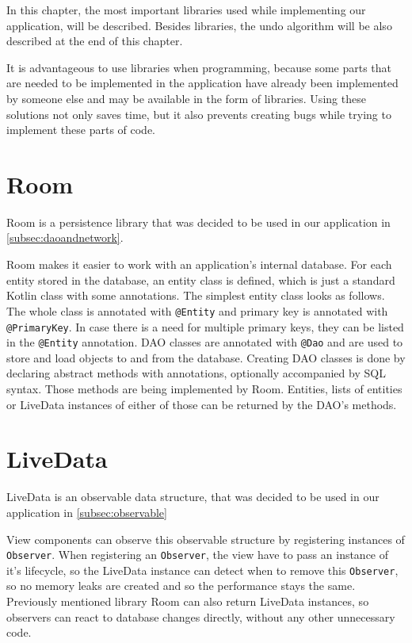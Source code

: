 In this chapter, the most important libraries used while implementing our application, will be described.
Besides libraries, the undo algorithm will be also described at the end of this chapter.

It is advantageous to use libraries when programming, because some parts that are needed to be implemented in the application have already been implemented by someone else and may be available in the form of libraries.
Using these solutions not only saves time, but it also prevents creating bugs while trying to implement these parts of code.

\section{Room}
Room is a persistence library that was decided to be used in our application in \autoref{subsec:daoandnetwork}.

Room makes it easier to work with an application's internal database.
For each entity stored in the database, an entity class is defined, which is just a standard Kotlin class with some annotations.
The simplest entity class looks as follows.
The whole class is annotated with \verb|@Entity| and primary key is annotated with \verb|@PrimaryKey|.
In case there is a need for multiple primary keys, they can be listed in the \verb|@Entity| annotation.
DAO classes are annotated with \verb|@Dao| and are used to store and load objects to and from the database.
Creating DAO classes is done by declaring abstract methods with annotations, optionally accompanied by SQL syntax.
Those methods are being implemented by Room.
Entities, lists of entities or LiveData instances of either of those can be returned by the DAO's methods.

\section{LiveData}
LiveData is an observable data structure, that was decided to be used in our application in \autoref{subsec:observable}

View components can observe this observable structure by registering instances of \verb|Observer|.
When registering an \verb|Observer|, the view have to pass an instance of it's lifecycle, so the LiveData instance can detect when to remove this \verb|Observer|, so no memory leaks are created and so the performance stays the same.
Previously mentioned library Room can also return LiveData instances, so observers can react to database changes directly, without any other unnecessary code.


